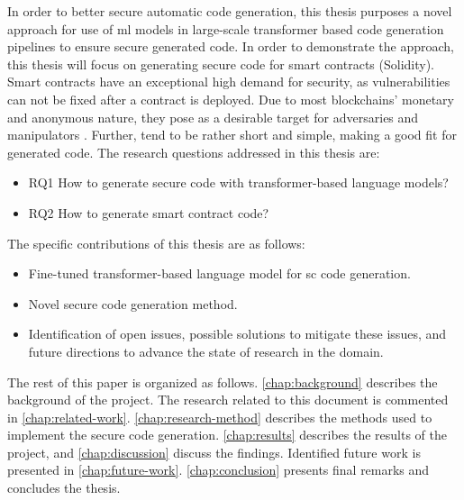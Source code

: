 In order to better secure automatic code generation, this thesis purposes a novel approach for use of \acrshort{ml} models in large-scale transformer based code generation pipelines to ensure secure generated code. In order to demonstrate the approach, this thesis will focus on generating secure code for smart contracts (Solidity). Smart contracts have an exceptional high demand for security, as vulnerabilities can not be fixed after a contract is deployed. Due to most blockchains' monetary and anonymous nature, they pose as a desirable target for adversaries and manipulators \cite{atzei2017survey}. Further,  tend to  be rather short and simple, making a good fit for generated code. The research questions addressed in this thesis are:
\begin{itemize}
    \item RQ1 How to generate secure code with transformer-based language models?
    \item RQ2 How to generate smart contract code?
\end{itemize}

The specific contributions of this thesis are as follows:
\begin{itemize}
    \item Fine-tuned transformer-based language model for \acrlong{sc} code generation.
    \item Novel secure code generation method.
    \item Identification of open issues, possible solutions to mitigate these issues, and future directions to advance the state of research in the domain.
\end{itemize}

The rest of this paper is organized as follows. \cref{chap:background} describes the background of the project. The research related to this document is commented in \cref{chap:related-work}. \cref{chap:research-method} describes the methods used to implement the secure code generation. \cref{chap:results} describes the results of the project, and \cref{chap:discussion} discuss the findings. Identified future work is presented in \cref{chap:future-work}. \cref{chap:conclusion} presents final remarks and concludes the thesis.
